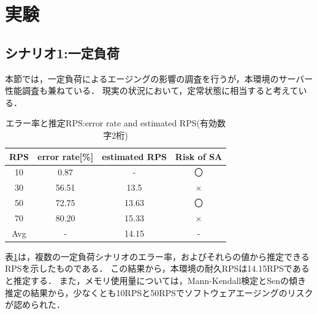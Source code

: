 \documentclass[twoside,twocolumn,10pt]{jarticle}  %
\begin{document}
\section{実験}
\subsection{シナリオ1:一定負荷}\label{subsec:load1}
本節では，一定負荷によるエージングの影響の調査を行うが，本環境のサーバー性能調査も兼ねている．
現実の状況において，定常状態に相当すると考えている．

\begin{table}[h]
  \centering
  \caption{エラー率と推定RPS:error rate and estimated RPS(有効数字2桁)}
  \label{tab:rps}
  \begin{tabular}{cccc}
      \hline \hline
      RPS & error rate[\%] & estimated RPS & Risk of SA\\ \hline
      10 & 0.87 & - & 〇 \\ \hline
      30 & 56.51 & 13.5 & ×\\ \hline
      50 & 72.75 & 13.63 & 〇 \\ \hline
      70 & 80.20 & 15.33 & × \\ \hline \hline
      Avg & - & 14.15  & -\\ \hline
  \end{tabular}
\end{table}

表\ref{tab:rps}は，複数の一定負荷シナリオのエラー率，およびそれらの値から推定できるRPSを示したものである．
この結果から，本環境の耐久RPSは14.15RPSであると推定する．
また，メモリ使用量については，Mann-Kendall検定とSenの傾き推定の結果から，少なくとも10RPSと50RPSでソフトウェアエージングのリスクが認められた．
\end{document}
